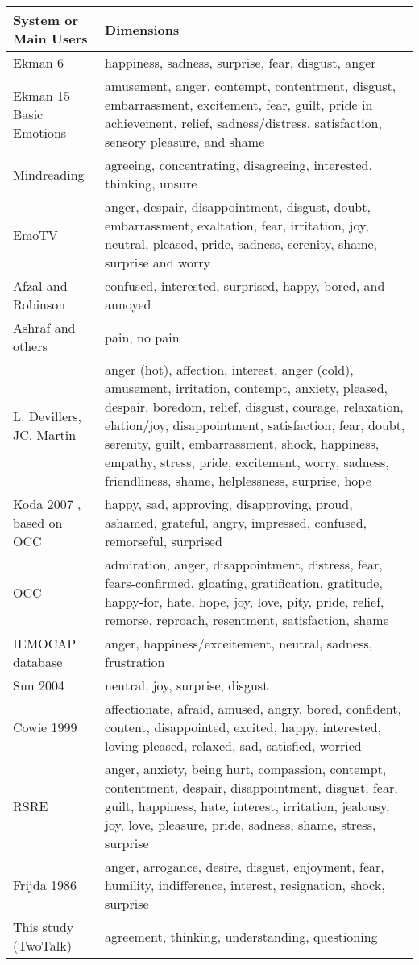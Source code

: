 \begin{tabular}{ | p{4cm} | p{9cm} | }
\hline
System or Main Users & Dimensions \\
\hline
\hline
Ekman 6 \cite{Ekman1972} & happiness, sadness, surprise, fear, disgust, anger \\ \hline
Ekman 15 Basic Emotions \cite{Ekman99} & amusement, anger, contempt, contentment, disgust, embarrassment, excitement, fear, guilt, pride in achievement, relief, sadness/distress, satisfaction, sensory pleasure, and shame \\ \hline
Mindreading \cite{ElKaliouby2004} & agreeing, concentrating, disagreeing, interested, thinking, unsure \\ \hline
EmoTV & anger, despair, disappointment, disgust, doubt, embarrassment, exaltation, fear, irritation, joy, neutral, pleased, pride, sadness, serenity, shame, surprise and worry \\ \hline
Afzal and Robinson \cite{Afzal2009} & confused, interested, surprised, happy, bored, and annoyed \\ \hline
Ashraf and others & pain, no pain \\ \hline
L. Devillers, JC. Martin \cite{Devillers2008} & anger (hot), affection, interest, anger (cold), amusement, irritation, contempt, anxiety, pleased, despair, boredom, relief, disgust, courage, relaxation, elation/joy, disappointment, satisfaction, fear, doubt, serenity, guilt, embarrassment, shock, happiness, empathy, stress, pride, excitement, worry, sadness, friendliness, shame, helplessness, surprise, hope \\ \hline
Koda 2007 \cite{Koda2007}, based on OCC & happy, sad, approving, disapproving, proud, ashamed, grateful, angry, impressed, confused, remorseful, surprised \\ \hline
OCC \cite{Ortony1988} & admiration, anger, disappointment, distress, fear, fears-confirmed, gloating, gratification, gratitude, happy-for, hate, hope, joy, love, pity, pride, relief, remorse, reproach, resentment, satisfaction, shame \\ \hline
IEMOCAP database \cite{Mower2009} & anger, happiness/exceitement, neutral, sadness, frustration \\ \hline
Sun 2004 & neutral, joy, surprise, disgust \\ \hline
Cowie 1999 & affectionate, afraid, amused, angry, bored, confident, content, disappointed, excited, happy, interested, loving
pleased, relaxed, sad, satisfied, worried \\ \hline
RSRE \cite{Fontaine2007} & anger, anxiety, being hurt, compassion, contempt, contentment, despair, disappointment, disgust, fear, guilt, happiness, hate, interest, irritation, jealousy, joy, love, pleasure, pride, sadness, shame, stress, surprise \\

Frijda 1986 \cite{Frijda1986} & anger, arrogance, desire, disgust, enjoyment, fear, humility, indifference, interest, resignation, shock, surprise \\ \hline

This study (TwoTalk) & agreement, thinking, understanding, questioning \\ 
\hline
\end{tabular} 
